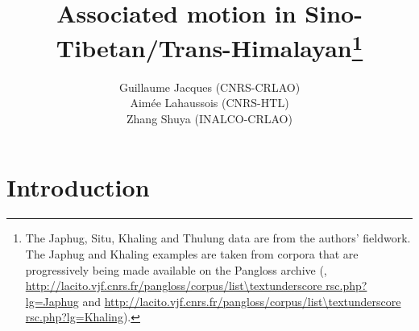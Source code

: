 \documentclass[oneside,a4paper,11pt]{article}
\begin{document}
 
\title{Associated motion in Sino-Tibetan/Trans-Himalayan\footnote{The Japhug, Situ, Khaling and Thulung data are from the authors' fieldwork. The Japhug and Khaling examples are taken from corpora that are progressively being made available on the Pangloss archive (\citealt{michailovsky14pangloss},  
 \url{http://lacito.vjf.cnrs.fr/pangloss/corpus/list\textunderscore rsc.php?lg=Japhug} and  \url{http://lacito.vjf.cnrs.fr/pangloss/corpus/list\textunderscore rsc.php?lg=Khaling}).}}
\author{Guillaume Jacques (CNRS-CRLAO)\\ Aimée Lahaussois (CNRS-HTL) \\ Zhang Shuya (INALCO-CRLAO)}
\date{}
\maketitle
%
%
%


\section{Introduction}
\end{document}
